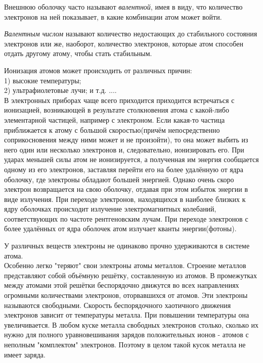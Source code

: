     \par Внешнюю оболочку часто называют \textit{валентной}, имея в виду, что количество электронов на ней показывает, в какие комбинации атом может войти.
    
    \par \textit{Валентным числом} называют количество недостающих до стабильного состояния электронов или же, наоборот, количество электронов, которые атом способен отдать другому атому, чтобы стать стабильным. 
	
	\par Ионизация атомов может происходить от различных причин:
	\\
	1) высокие температуры;\\
	2) ультрафиолетовые лучи; и т.д. ....\\
	В электронных приборах чаще всего приходится приходится встречаться с ионизацией, возникающей в результате столкновения атома с какой-либо элементарной частицей, например с электроном. Если какая-то частица приближается к атому с большой скоростью(причём непосредственно соприкосновения между ними может и не произойти), то она может выбить из него один или несколько электронов и, следовательно, ионизировать его. При ударах меньшей силы атом не ионизируется, а полученная им энергия сообщается одному из его электронов, заставляя перейти его на более удалённую от ядра оболочку, где электроны обладают большей энергией. Однако очень скоро электрон возвращается на свою оболочку, отдавая при этом избыток энергии в виде излучения. При переходе электронов, находящихся в наиболее близких к ядру оболочках происходит излучение электромагнитных колебаний, соответствующих по частоте рентгеновским лучам. При переходе электронов с более удалённых от ядра оболочек атом излучает кванты энергии(фотоны).
	
	\par У различных веществ электроны не одинаково прочно удерживаются в системе атома.
	\\ 
	Особенно легко "теряют" свои электроны атомы металлов. Строение металлов представляют собой объёмную решётку, составленную из атомов. В промежутках между атомами этой решётки беспорядочно движутся во всех направлениях огромными количествами электронов, оторвавшихся от атомов. Эти электроны называются свободными. Скорость беспорядочного хаотичного движения электронов зависит от температуры металла. При повышении температуры она увеличивается. В любом куске металла свободных электронов столько, сколько их нужно для полного уравновешивания зарядов положительных ионов - атомов с неполным "комплектом" электронов. Поэтому в целом такой кусок металла не имеет заряда.
	
